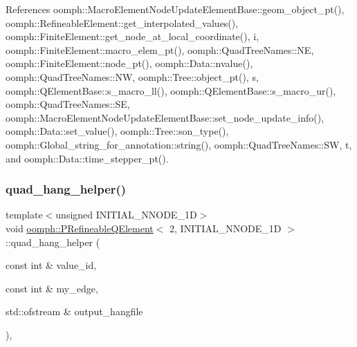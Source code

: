 References oomph\+::\+Macro\+Element\+Node\+Update\+Element\+Base\+::geom\+\_\+object\+\_\+pt(), oomph\+::\+Refineable\+Element\+::get\+\_\+interpolated\+\_\+values(), oomph\+::\+Finite\+Element\+::get\+\_\+node\+\_\+at\+\_\+local\+\_\+coordinate(), i, oomph\+::\+Finite\+Element\+::macro\+\_\+elem\+\_\+pt(), oomph\+::\+Quad\+Tree\+Names\+::\+NE, oomph\+::\+Finite\+Element\+::node\+\_\+pt(), oomph\+::\+Data\+::nvalue(), oomph\+::\+Quad\+Tree\+Names\+::\+NW, oomph\+::\+Tree\+::object\+\_\+pt(), s, oomph\+::\+Q\+Element\+Base\+::s\+\_\+macro\+\_\+ll(), oomph\+::\+Q\+Element\+Base\+::s\+\_\+macro\+\_\+ur(), oomph\+::\+Quad\+Tree\+Names\+::\+SE, oomph\+::\+Macro\+Element\+Node\+Update\+Element\+Base\+::set\+\_\+node\+\_\+update\+\_\+info(), oomph\+::\+Data\+::set\+\_\+value(), oomph\+::\+Tree\+::son\+\_\+type(), oomph\+::\+Global\+\_\+string\+\_\+for\+\_\+annotation\+::string(), oomph\+::\+Quad\+Tree\+Names\+::\+SW, t, and oomph\+::\+Data\+::time\+\_\+stepper\+\_\+pt().

\mbox{\label{classoomph_1_1PRefineableQElement_3_012_00_01INITIAL__NNODE__1D_01_4_abf33572d0ba9cd9bf06ca137256c422d}} 
\subsubsection{\texorpdfstring{quad\+\_\+hang\+\_\+helper()}{quad\_hang\_helper()}}
{\footnotesize\ttfamily template$<$unsigned I\+N\+I\+T\+I\+A\+L\+\_\+\+N\+N\+O\+D\+E\+\_\+1D$>$ \\
void \hyperlink{classoomph_1_1PRefineableQElement}{oomph\+::\+P\+Refineable\+Q\+Element}$<$ 2, I\+N\+I\+T\+I\+A\+L\+\_\+\+N\+N\+O\+D\+E\+\_\+1D $>$\+::quad\+\_\+hang\+\_\+helper (\begin{DoxyParamCaption}\item[{const int \&}]{value\+\_\+id,  }\item[{const int \&}]{my\+\_\+edge,  }\item[{std\+::ofstream \&}]{output\+\_\+hangfile }\end{DoxyParamCaption})\hspace{0.3cm}{\ttfamily [protected]}, {\ttfamily [virtual]}}



